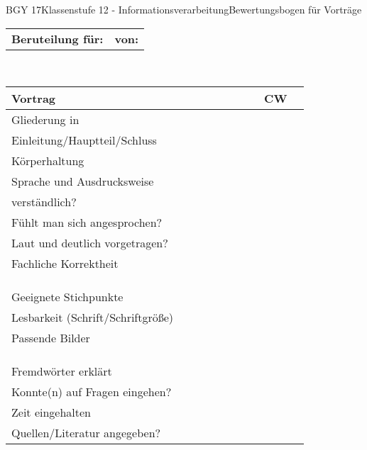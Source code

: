 \documentclass[oneside,openany,headings=optiontotoc,11pt,numbers=noenddot]{scrreprt}
\begin{document}
	\begin{worksheet}{BGY 17}{Klassenstufe 12 - Informationsverarbeitung}{Bewertungsbogen für Vorträge}
		\begin{landscape}
			\noindent
			\sffamily
			\begin{tabularx}{\textwidth}{Xr}
				\textbf{Beruteilung für:\underline{\color{white}{Gruppenname der Vortragenden}}}\normalcolor & \textbf{von:} \underline{\color{white}{Hier die Namen der Beurteilenden}}
			\end{tabularx}\\
			\par\noindent
			\begin{tabularx}{\textwidth}{|l|M|M|M|M|M|M|M|M|M|}
				\hline
				 \textbf{Vortrag} & & & & & & & & \textbf{CW}\\
				\hline
				Gliederung in & & & & & & & & \\
				Einleitung/Hauptteil/Schluss & & & & & & & & \\
				\hline
				Körperhaltung & & & & & & & & \\
				\hline
				Sprache und Ausdrucksweise  & & & & & & & & \\
				verständlich? & & & & & & & & \\
				\hline
				Fühlt man sich angesprochen? & & & & & & & & \\
				\hline
				Laut und deutlich vorgetragen? & & & & & & & & \\
				\hline
				Fachliche Korrektheit & & & & & & & & \\
				\hline
				\\
				\\
				\hline
				  \\
				\hline
				Geeignete Stichpunkte & & & & & & & & \\
				\hline
				Lesbarkeit (Schrift/Schriftgröße) & & & & & & & & \\
				\hline
				Passende Bilder & & & & & & & & \\
				\hline
				\\
				\\
				\hline
				 \\
				\hline
				Fremdwörter erklärt & & & & & & & & \\
				\hline
				Konnte(n) auf Fragen eingehen? & & & & & & & & \\
				\hline
				Zeit eingehalten & & & & & & & & \\
				\hline
				Quellen/Literatur angegeben? & & & & & & & & \\
				\hline
			\end{tabularx}
		\end{landscape}
	\end{worksheet}
\end{document}
